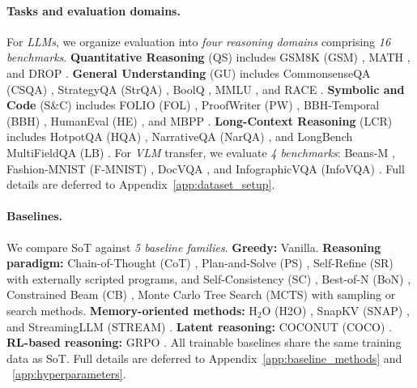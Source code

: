     \paragraph{Tasks and evaluation domains.}
    For \emph{LLMs}, we organize evaluation into \emph{four reasoning domains} comprising \emph{16 benchmarks}.
    \textbf{Quantitative Reasoning} (QS) includes GSM8K (GSM) \citep{cobbe2021gsm8k}, MATH \citep{hendrycks2021measuring}, and DROP \citep{dua2019drop}.
    \textbf{General Understanding} (GU) includes CommonsenseQA (CSQA) \citep{talmor2019commonsenseqa}, StrategyQA (StrQA) \citep{geva2021did}, BoolQ \citep{clark2019boolq}, MMLU \citep{hendrycks2021measuringmassive}, and RACE \citep{lai2017race}.
    \textbf{Symbolic and Code} (S\&C) includes FOLIO (FOL) \citep{han2024folio}, ProofWriter (PW) \citep{tafjord2021proofwriter}, BBH-Temporal (BBH) \citep{srivastava2023beyond}, HumanEval (HE) \citep{chen2021evaluating}, and MBPP \citep{austin2021program}.
    \textbf{Long-Context Reasoning} (LCR) includes HotpotQA (HQA) \citep{yang2018hotpotqa}, NarrativeQA (NarQA) \citep{kocisky2018narrativeqa}, and LongBench MultiFieldQA (LB) \citep{bai2024longbench}.
    For \emph{VLM} transfer, we evaluate \emph{4 benchmarks}: Beans-M \citep{makerere2020beans}, Fashion-MNIST (F-MNIST) \citep{xiao2017fashion}, DocVQA \citep{mathew2021docvqa}, and InfographicVQA (InfoVQA) \citep{mathew2022infographicvqa}.
    Full details are deferred to Appendix~\ref{app:dataset_setup}.
    
    \paragraph{Baselines.}
    We compare SoT against \emph{5 baseline families}. 
    \textbf{Greedy:} Vanilla. 
    \textbf{Reasoning paradigm:} Chain-of-Thought (CoT) \citep{wei2022chain}, Plan-and-Solve (PS) \citep{wang2023plan}, Self-Refine (SR) \citep{madaan2023self} with externally scripted programs, and Self-Consistency (SC) \citep{wang2023selfconsistency}, Best-of-N (BoN) \citep{snell2024scaling}, Constrained Beam (CB) \citep{hokamp2017lexically}, Monte Carlo Tree Search (MCTS) \citep{xie2024mcts} with sampling or search methods.
    \textbf{Memory-oriented methods:} H$_2$O (H2O) \citep{zhang2023h2o}, SnapKV (SNAP) \citep{li2024snapkv}, and StreamingLLM (STREAM) \citep{xiao2023streamingllm}. 
    \textbf{Latent reasoning:} COCONUT (COCO) \citep{hao2025training}. 
    \textbf{RL-based reasoning:} GRPO \citep{shao2024deepseekmath}. 
    All trainable baselines share the same training data as SoT. Full details are deferred to Appendix~\ref{app:baseline_methods} and ~\ref{app:hyperparameters}.
    
